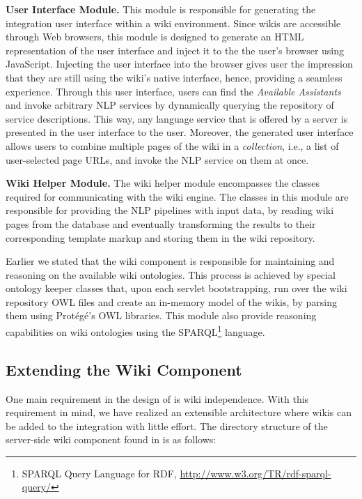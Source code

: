 \blankline
\noindent
\textbf{User Interface Module. }{This module is responsible for generating the integration user interface within a wiki environment. Since wikis are accessible through Web browsers, this module is designed to generate an HTML representation of the \sa user interface and inject it to the the user's browser using JavaScript. Injecting the user interface into the browser gives user the impression that they are still using the wiki's native interface, hence, providing a seamless experience. Through this user interface, users can find the \emph{Available Assistants} and invoke arbitrary NLP services by dynamically querying the \sa repository of service descriptions. This way, any language service that is offered by a \sa server is presented in the user interface to the user. Moreover, the generated user interface allows users to combine multiple pages of the wiki in a \emph{collection}, i.e., a list of user-selected page URLs, and invoke the NLP service on them at once.}

\blankline
\noindent
\textbf{Wiki Helper Module. }{The wiki helper module encompasses the classes required for communicating with the wiki engine. The classes in this module are responsible for providing the NLP pipelines with input data, by reading wiki pages from the database and eventually transforming the results to their corresponding template markup and storing them in the wiki repository.}

\blankline
Earlier we stated that the wiki component is responsible for maintaining and reasoning on the available wiki ontologies. This process is achieved by special ontology keeper classes that, upon each servlet bootstrapping, run over the wiki repository OWL files and create an in-memory model of the wikis, by parsing them using Prot\'{e}g\'{e}'s OWL libraries. This module also provide reasoning capabilities on wiki ontologies using the SPARQL\footnote{SPARQL Query Language for RDF, \url{http://www.w3.org/TR/rdf-sparql-query/}} language.

\subsection{Extending the Wiki Component}
One main requirement in the design of \wikinlp is wiki independence. With this requirement in mind, we have realized an extensible architecture where wikis can be added to the integration with little effort. The directory structure of the server-side wiki component found in  is as follows:

